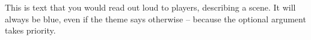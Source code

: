 \begin{ExampleBlock}{}
\begin{RpgNarration}[color=blue!30!white]
    This is text that you would read out loud to players, describing a scene. It will always be blue, even if the theme says otherwise -- because the optional argument takes priority.
\end{RpgNarration}


\end{ExampleBlock}
